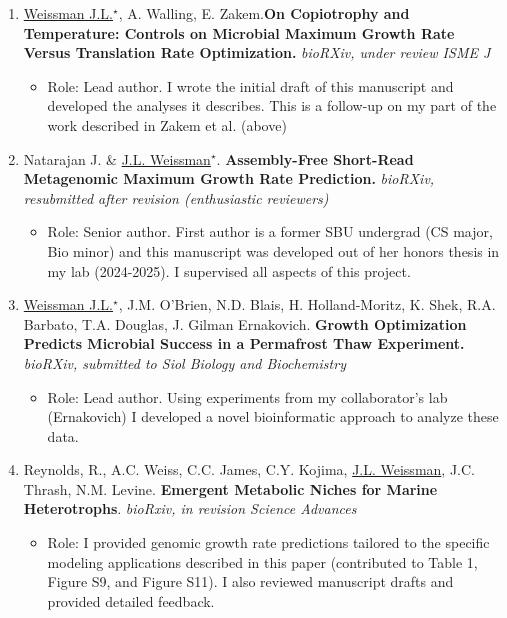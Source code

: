 \documentclass[]{res}
\begin{document}
\begin{resume}
 \begin{enumerate}[leftmargin=*]
 \setlength\itemsep{0.25em}

\item \underline{Weissman J.L.$^\star$},  A. Walling, E. Zakem.{\bf  On Copiotrophy and Temperature: Controls on Microbial Maximum Growth Rate Versus Translation Rate Optimization.}  \emph{bioRXiv, under review ISME J} 

\begin{itemize}
 	\item Role: Lead author. I wrote the initial draft of this manuscript and developed the analyses it describes. This is a follow-up on my part of  the work described in Zakem et al. (above)
 \end{itemize}
 
\item Natarajan J. \& \underline{J.L. Weissman$^\star$}. {\bf Assembly-Free Short-Read Metagenomic Maximum Growth Rate Prediction.} \emph{bioRXiv, resubmitted after revision (enthusiastic reviewers)} 

\begin{itemize}
 	\item Role: Senior author. First author is a former SBU undergrad (CS major, Bio minor) and this manuscript was developed out of her honors thesis in my lab (2024-2025). I supervised all aspects of this project. 
 \end{itemize}
 
\item \underline{Weissman J.L.$^\star$}, J.M. O'Brien, N.D. Blais, H. Holland-Moritz, K. Shek, R.A. Barbato, T.A. Douglas, J. Gilman Ernakovich. {\bf Growth Optimization Predicts Microbial Success in a Permafrost Thaw Experiment.} \emph{bioRXiv, submitted to Siol Biology and Biochemistry}

\begin{itemize}
 	\item Role: Lead author. Using experiments from my collaborator's lab (Ernakovich) I developed a novel bioinformatic approach to analyze these data.
\end{itemize}

\item Reynolds, R., A.C. Weiss, C.C. James, C.Y. Kojima, \underline{J.L. Weissman}, J.C. Thrash, N.M. Levine. {\bf Emergent Metabolic Niches for Marine Heterotrophs}. \emph{bioRxiv, in revision Science Advances}

\begin{itemize}
 	\item Role: I provided genomic growth rate predictions tailored to the specific modeling applications described in this paper (contributed to Table 1, Figure S9, and Figure S11). I also reviewed manuscript drafts and provided detailed feedback.
\end{itemize}


\end{enumerate}
\end{resume}
\end{document}
